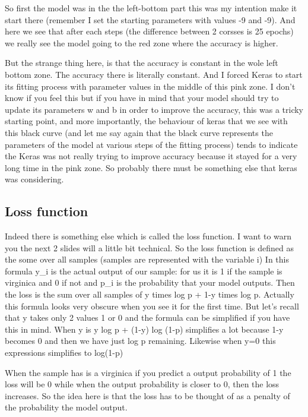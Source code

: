 \documentclass{article}
\begin{document}
So first the model was in the the left-bottom part this was my intention  make it 
start there (remember I set the starting parameters with values -9 and -9).
And here we see that after each steps (the difference between 2 corsses is 25 epochs) 
we really see the model going to the red zone where the accuracy is higher.

But the strange thing here, is that the accuracy is constant in the wole left bottom zone.
The accuracy there is literally constant. 
And I forced Keras to start its fitting process with parameter values in the middle of 
this pink zone. 
I don't know if you feel this but if you have in mind that your model should try 
to update its parameters w and b in order to improve the accuracy, this was a tricky 
starting point, and more importantly, the behaviour of keras 
that we see with this black curve (and let me say again that the black curve 
represents the parameters of the model at various steps of the fitting process)
tends to indicate the Keras was not really trying to improve accuracy because 
it stayed for a very long time in the pink zone. 
So probably there must be something else that keras was considering. 

\subsection{Loss function}

Indeed there is something else which is called the loss function.
I want to warn you the next 2 slides will a little bit technical.
So the loss function is defined as the some over all samples 
(samples are represented with the variable i) 
In this formula y\_i is the actual output of our sample: 
for us it is 1 if the sample is virginica and 0 if not
and p\_i is the probability that your model outputs.
Then the loss is 
the sum over all samples of y times log p + 
1-y times log p.
Actually this formula looks very obscure when you see it for the first time. 
But let's recall that y takes only 2 values 1 or 0
and the formula can be simplified if you have this in mind.
When y is y log p + (1-y) log (1-p) simplifies a lot because 1-y becomes 0 and 
then we have just log p remaining. 
Likewise when y=0 this expressions simplifies to log(1-p)

When the sample has is a virginica if you predict a output probability of 1 the loss will be 0
while when the output probability is closer to 0, then the loss increases.
So the idea here is that the loss has to be thought of as a penalty of the 
probability the model output.
\end{document}

